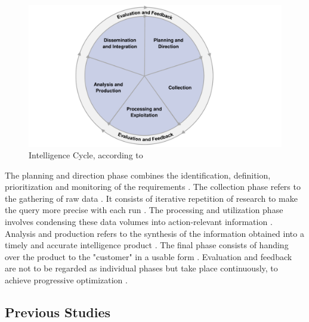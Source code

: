\documentclass[10pt]{article}
\begin{document}
\begin{figure}[h]
    \centering
    \includegraphics[clip,width=0.8\linewidth]{PDF/images/crop_Intelligence Cycle}
    \caption{Intelligence Cycle, according to \cite{JointChiefsofStaffU.S.Army.2013}}
    \label{fig: intelligence cycle}
\end{figure}

The planning and direction phase combines the identification, definition, prioritization and monitoring
of the requirements \cite{JointChiefsofStaffU.S.Army.2013}.
The collection phase refers to the gathering of raw data \cite{CentralIntelligenceAgency.1987}.
It consists of iterative repetition of research
\cite{NorthAtlanticTreatyOrganization.2001} to make the query more precise with each run
\cite{PastorGalindo.2020}. The processing and utilization phase involves condensing
these data volumes into action-relevant information
\cite{JointChiefsofStaffU.S.Army.2013}.
Analysis and production refers to the synthesis of the information obtained into a timely and accurate intelligence product
\cite{Hwang.2022, NorthAtlanticTreatyOrganization.2001}.
The final phase consists of handing over the product to the "customer" in a
usable form \cite{CentralIntelligenceAgency.2023, Williams.2018}.
Evaluation and feedback are not to be regarded as individual phases
but take place continuously, to achieve progressive optimization
\cite{JointChiefsofStaffU.S.Army.2013, NorthAtlanticTreatyOrganization.2001}.

\subsection{Previous Studies}
\end{document}
